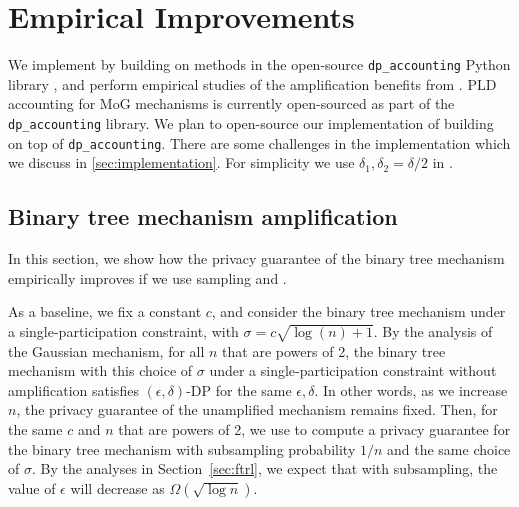 \section{Empirical Improvements}\label{sec:empirical}


We implement \CPTB{} by building on methods in the open-source \texttt{dp\_accounting} Python library \citep{pldlib}, and perform empirical studies of the amplification benefits from \MMCC{}.  PLD accounting for MoG mechanisms is currently open-sourced as part of the \texttt{dp\_accounting} library. We plan to open-source our implementation of \CPTB{} building on top of \texttt{dp\_accounting}. There are some challenges in the implementation which we discuss in \cref{sec:implementation}. For simplicity we use $\delta_1, \delta_2 = \delta/2$ in \CPTB{}.

\subsection{Binary tree mechanism amplification}
In this section, we show how the privacy guarantee of the binary tree mechanism empirically improves if we use sampling and \MMCC{}.

As a baseline, we fix a constant $c$, and consider the binary tree mechanism under a single-participation constraint, with $\sigma = c \sqrt{\log(n) + 1}$. By the analysis of the Gaussian mechanism, for all $n$ that are powers of 2, the binary tree mechanism with this choice of $\sigma$ under a single-participation constraint without amplification satisfies $(\epsilon, \delta)$-DP for the same $\epsilon, \delta$. In other words, as we increase $n$, the privacy guarantee of the unamplified mechanism remains fixed. Then, for the same $c$ and $n$ that are powers of 2, we use \CPTB{} to compute a privacy guarantee for the binary tree mechanism with subsampling probability $1/n$ and the same choice of $\sigma$.  By the analyses in Section~\ref{sec:ftrl}, we expect that with subsampling, the value of $\epsilon$ will decrease as $\Omega(\sqrt{\log n})$.

